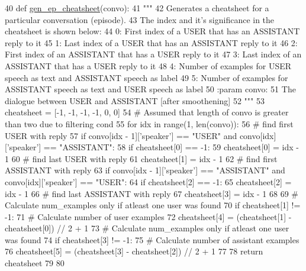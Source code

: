 \begin{DoxyCode}
40 \textcolor{keyword}{def }\hyperlink{namespaceparlai_1_1tasks_1_1taskmaster_1_1tm__utils_aad8e1c42802da1765887ff0407bed1b1}{gen\_ep\_cheatsheet}(convo):
41     \textcolor{stringliteral}{"""}
42 \textcolor{stringliteral}{    Generates a cheatsheet for a particular conversation (episode).}
43 \textcolor{stringliteral}{    The index and it's significance in the cheatsheet is shown below:}
44 \textcolor{stringliteral}{        0: First index of a USER that has an ASSISTANT reply to it}
45 \textcolor{stringliteral}{        1: Last index of a USER that has an ASSISTANT reply to it}
46 \textcolor{stringliteral}{        2: First index of an ASSISTANT that has a USER reply to it}
47 \textcolor{stringliteral}{        3: Last index of an ASSISTANT that has a USER reply to it}
48 \textcolor{stringliteral}{        4: Number of examples for USER speech  as text and ASSISTANT speech as label}
49 \textcolor{stringliteral}{        5: Number of examples for ASSISTANT speech as text and USER speech  as label}
50 \textcolor{stringliteral}{    :param convo:}
51 \textcolor{stringliteral}{        The dialogue between USER and ASSISTANT [after smoothening]}
52 \textcolor{stringliteral}{    """}
53     cheatsheet = [-1, -1, -1, -1, 0, 0]
54     \textcolor{comment}{# Assumed that length of convo is greater than two due to filtering cond}
55     \textcolor{keywordflow}{for} idx \textcolor{keywordflow}{in} range(1, len(convo)):
56         \textcolor{comment}{# find first USER with reply}
57         \textcolor{keywordflow}{if} convo[idx - 1][\textcolor{stringliteral}{'speaker'}] == \textcolor{stringliteral}{"USER"} \textcolor{keywordflow}{and} convo[idx][\textcolor{stringliteral}{'speaker'}] == \textcolor{stringliteral}{"ASSISTANT"}:
58             \textcolor{keywordflow}{if} cheatsheet[0] == -1:
59                 cheatsheet[0] = idx - 1
60             \textcolor{comment}{# find last USER with reply}
61             cheatsheet[1] = idx - 1
62         \textcolor{comment}{# find first ASSISTANT with reply}
63         \textcolor{keywordflow}{if} convo[idx - 1][\textcolor{stringliteral}{'speaker'}] == \textcolor{stringliteral}{"ASSISTANT"} \textcolor{keywordflow}{and} convo[idx][\textcolor{stringliteral}{'speaker'}] == \textcolor{stringliteral}{"USER"}:
64             \textcolor{keywordflow}{if} cheatsheet[2] == -1:
65                 cheatsheet[2] = idx - 1
66             \textcolor{comment}{# find last ASSISTANT with reply}
67             cheatsheet[3] = idx - 1
68 
69         \textcolor{comment}{# Calculate num\_examples only if atleast one user was found}
70         \textcolor{keywordflow}{if} cheatsheet[1] != -1:
71             \textcolor{comment}{# Calculate number of user examples}
72             cheatsheet[4] = (cheatsheet[1] - cheatsheet[0]) // 2 + 1
73         \textcolor{comment}{# Calculate num\_examples only if atleast one user was found}
74         \textcolor{keywordflow}{if} cheatsheet[3] != -1:
75             \textcolor{comment}{# Calculate number of assistant examples}
76             cheatsheet[5] = (cheatsheet[3] - cheatsheet[2]) // 2 + 1
77 
78     \textcolor{keywordflow}{return} cheatsheet
79 
80 
\end{DoxyCode}
